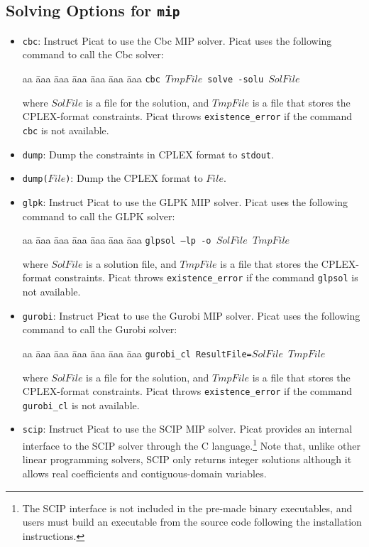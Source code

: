 \subsection{Solving Options for \texttt{mip}}
\begin{itemize}
\item \texttt{cbc}: Instruct Picat to use the Cbc MIP solver. Picat uses the following command to call the Cbc solver:
\begin{tabbing}
aa \= aaa \= aaa \= aaa \= aaa \= aaa \= aaa \kill
\> \texttt{cbc $TmpFile$ solve -solu $SolFile$ }
\end{tabbing}
where $SolFile$ is a file for the solution, and $TmpFile$ is a file that stores the CPLEX-format constraints. Picat throws \texttt{existence\_error} if the command \texttt{cbc} is not available.
\item \texttt{dump}: Dump the constraints in CPLEX format to \texttt{stdout}.
\item \texttt{dump($File$)}: Dump the CPLEX format to $File$.
\item \texttt{glpk}: Instruct Picat to use the GLPK MIP solver. Picat uses the following command to call the GLPK solver:
\begin{tabbing}
aa \= aaa \= aaa \= aaa \= aaa \= aaa \= aaa \kill
\> \texttt{glpsol --lp -o $SolFile$ $TmpFile$}
\end{tabbing}
where $SolFile$ is a solution file, and $TmpFile$ is a file that stores the CPLEX-format constraints. Picat throws \texttt{existence\_error} if the command \texttt{glpsol} is not available.
\item \texttt{gurobi}: Instruct Picat to use the Gurobi MIP solver. Picat uses the following command to call the Gurobi solver:
\begin{tabbing}
aa \= aaa \= aaa \= aaa \= aaa \= aaa \= aaa \kill
\> \texttt{gurobi\_cl ResultFile=$SolFile$ $TmpFile$}
\end{tabbing}
where $SolFile$ is a file for the solution, and $TmpFile$ is a file that stores the CPLEX-format constraints. Picat throws \texttt{existence\_error} if the command \texttt{gurobi\_cl} is not available.
\item \texttt{scip}: Instruct Picat to use the SCIP MIP solver. Picat provides an internal interface to the SCIP solver through the C language.\footnote{The SCIP interface is not included in the pre-made binary executables, and users must build an executable from the source code following the installation instructions.} Note that, unlike other linear programming solvers, SCIP only returns integer solutions although it allows real coefficients and contiguous-domain variables.
\end{itemize}

